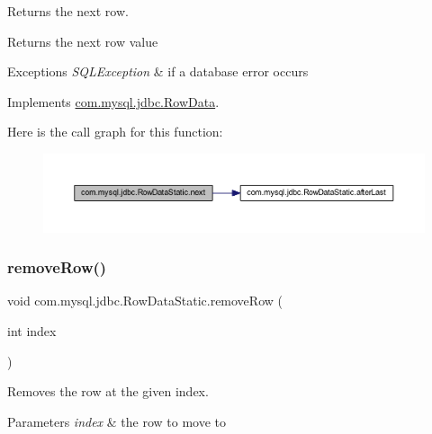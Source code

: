 Returns the next row.

\begin{DoxyReturn}{Returns}
the next row value 
\end{DoxyReturn}

\begin{DoxyExceptions}{Exceptions}
{\em S\+Q\+L\+Exception} & if a database error occurs \\
\hline
\end{DoxyExceptions}


Implements \mbox{\hyperlink{interfacecom_1_1mysql_1_1jdbc_1_1_row_data_a1984eb77a7be765f3da79a1e2349af59}{com.\+mysql.\+jdbc.\+Row\+Data}}.

Here is the call graph for this function\+:
\nopagebreak
\begin{figure}[H]
\begin{center}
\leavevmode
\includegraphics[width=350pt]{classcom_1_1mysql_1_1jdbc_1_1_row_data_static_ac220fe255287ae80ffb925828f4e4865_cgraph}
\end{center}
\end{figure}
\mbox{\label{classcom_1_1mysql_1_1jdbc_1_1_row_data_static_a585e76cb9cacd6c1fea15b2d4739f622}} 
\subsubsection{\texorpdfstring{remove\+Row()}{removeRow()}}
{\footnotesize\ttfamily void com.\+mysql.\+jdbc.\+Row\+Data\+Static.\+remove\+Row (\begin{DoxyParamCaption}\item[{int}]{index }\end{DoxyParamCaption})}

Removes the row at the given index.


\begin{DoxyParams}{Parameters}
{\em index} & the row to move to \\
\hline
\end{DoxyParams}

